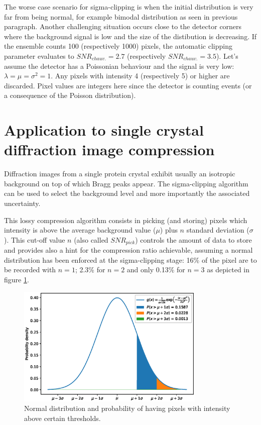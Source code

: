 \documentclass[preprint]{iucr}              %
\begin{document}
The worse case scenario for sigma-clipping is when the initial distribution is very far from being normal, for example bimodal distribution as seen in previous paragraph.
Another challenging situation occurs close to the detector corners where the background signal is low and the size of the distibution is decreasing. 
If the ensemble counts 100 (respectively 1000) pixels, the automatic clipping parameter evaluates to $SNR_{chauv.} = 2.7$ (respectively $SNR_{chauv.} = 3.5$).
Let's assume the detector has a Poissonian behaviour and the signal is very low: $\lambda = \mu = \sigma^2 = 1$. 
Any pixels with intensity 4 (respectively 5) or higher are discarded. 
Pixel values are integers here since the detector is counting events (or a consequence of the Poisson distribution).

\section{Application to single crystal diffraction image compression}
Diffraction images from a single protein crystal exhibit usually an isotropic background on top of which Bragg peaks appear.
The sigma-clipping algorithm can be used to select the background level and more importantly the associated uncertainty.

This lossy compression algorithm consists in picking (and storing) pixels which intensity is above the average background value ($\mu$) plus $n$ standard deviation ($\sigma$). 
This cut-off value $n$ (also called $SNR_{pick}$) controls the amount of data to store and provides also a hint for the compression ratio achievable, assuming a normal distribution has been enforced at the sigma-clipping stage: 16\% of the pixel are to be recorded with $n=1$;  2.3\% for $n=2$ and only 0.13\% for $n=3$ as depicted in figure \ref{distribution}.
\begin{figure}
\label{distribution}
\begin{center}
\includegraphics[width=9cm]{distribution}
\caption{Normal distribution and probability of having pixels with intensity above certain thresholds.}
\end{center}
\end{figure}
\end{document}
